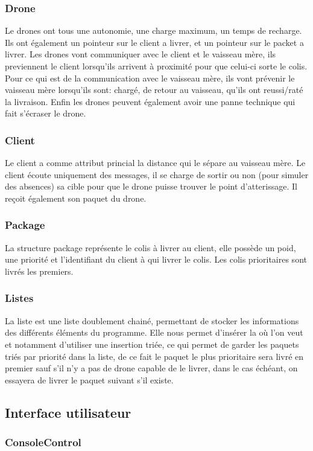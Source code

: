 \documentclass[article, backcover, french, nodocumentinfo]{upmethodology-document}
\newcommand{\TODO}[2][ ]{\todo[inline,color=green]{#2}}
\begin{document}
			\subsubsection{Drone}
			Le drones ont tous une autonomie, une charge maximum, un temps de recharge. Ils ont également un pointeur sur le client a livrer,
			et un pointeur sur le packet a livrer.
			Les drones vont communiquer avec le client et le vaisseau mère, ils previennent le client lorsqu'ils arrivent à proximité pour que
			celui-ci sorte le colis. Pour ce qui est de la communication avec le vaisseau mère, ils vont prévenir le vaisseau mère lorsqu'ils sont:
			chargé, de retour au vaisseau, qu'ils ont reussi/raté la livraison.
			Enfin les drones peuvent également avoir une panne technique qui fait s'écraser le drone.
			\subsubsection{Client}
			Le client a comme attribut princial la distance qui le sépare au vaisseau mère. Le client écoute uniquement des messages,
			il se charge de sortir ou non (pour simuler des absences) sa cible pour que le drone puisse trouver le point d'atterissage.
			Il reçoit également son paquet du drone.
			\subsubsection{Package}
			La structure package représente le colis à livrer au client, elle possède un poid, une priorité et l'identifiant du client à qui livrer le colis.
			Les colis prioritaires sont livrés les premiers.
			\subsubsection{Listes}
			La liste est une liste doublement chainé, permettant de stocker les informations des différents éléments du programme.
			Elle nous permet d'insérer la où l'on veut et notamment d'utiliser une insertion triée, ce qui permet de garder les paquets
			triés par priorité dans la liste, de ce fait le paquet le plus prioritaire sera livré en premier sauf s'il n'y a pas de drone
			capable de le livrer, dans le cas échéant, on essayera de livrer le paquet suivant s'il existe.
		\subsection{Interface utilisateur}
			\subsubsection{ConsoleControl}
				\TODO{lib pour faire des UI en console}
\end{document}
